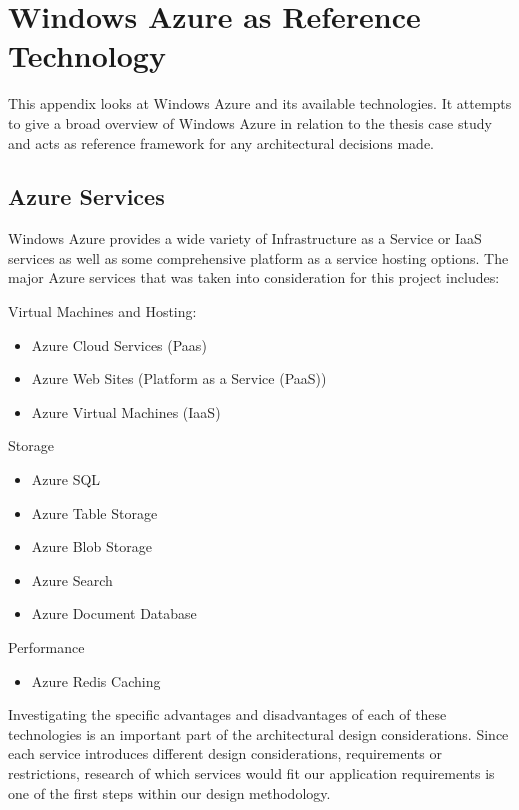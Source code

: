\chapter{Windows Azure as Reference Technology}
\label{appendix:azure}
This appendix looks at Windows Azure and its available technologies. It attempts to give a broad overview of Windows Azure in relation to the thesis case study and acts as reference framework for any architectural decisions made.

\section{Azure Services}

Windows Azure provides a wide variety of Infrastructure as a Service or IaaS  services as well as some comprehensive platform as a service hosting options. The major Azure services that was taken into consideration for this project includes:

Virtual Machines and Hosting:
\begin{itemize}
\item Azure Cloud Services (Paas)
\item Azure Web Sites (Platform as a Service (PaaS))
\item Azure Virtual Machines (IaaS)
\end{itemize}

Storage
\begin{itemize}
\item Azure SQL
\item Azure Table Storage
\item Azure Blob Storage
\item Azure Search
\item Azure Document Database
\end{itemize}

Performance
\begin{itemize}
\item Azure Redis Caching
\end{itemize}

Investigating the specific advantages and disadvantages of each of these technologies is an important part of the architectural design considerations. Since each service introduces different design considerations, requirements or restrictions, research of which services would fit our application requirements is one of the first steps within our design methodology.

